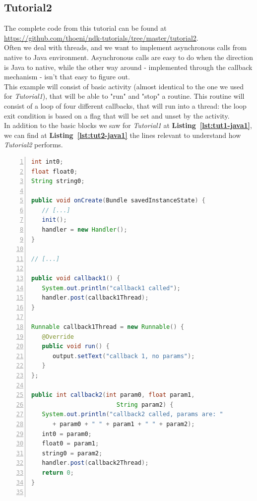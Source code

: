 \documentclass[a4paper,10pt]{article}
\newcommand{\refl}[1]{\textbf{Listing~\ref{#1}}}
\begin{document}
\begin{multicols}{2}

\section{Tutorial2}
\label{sec:tutorial2}
The complete code from this tutorial can be found at
\url{https://github.com/thoeni/ndk-tutorials/tree/master/tutorial2}.\\
Often we deal with threads, and we want to implement asynchronous calls from
native to Java environment. Asynchronous calls are easy to do when the direction
is Java to native, while the other way around - implemented through the callback
mechanism - isn't that easy to figure out.\\
This example will consist of basic activity (almost identical to the one we used
for \textit{Tutorial1}), that will be able to "run" and "stop" a routine. This
routine will consist of a loop of four different callbacks, that will run into a
thread: the loop exit condition is based on a flag that will be set and unset by
the activity.\\
In addition to the basic blocks we saw for \textit{Tutorial1} at
\refl{lst:tut1-java1}, we can find at \refl{lst:tut2-java1} the lines relevant
to understand how \textit{Tutorial2} performs.
\begin{lstlisting}[language=Java,
		   columns=fullflexible,
		   showstringspaces=false,
		   xleftmargin=15pt,
		   frame = l,
		   numbers=left,
		   commentstyle=\color{gray}\upshape,
		   caption=Part of Tutorial2Activity.java source code,
		   label=lst:tut2-java1]
int int0;
float float0;
String string0;

public void onCreate(Bundle savedInstanceState) {
   // [...]
   init();
   handler = new Handler();
}

// [...]

public void callback1() {
   System.out.println("callback1 called");
   handler.post(callback1Thread);
}

Runnable callback1Thread = new Runnable() {
   @Override
   public void run() {
      output.setText("callback 1, no params");
   }
};

public int callback2(int param0, float param1,
                        String param2) {
   System.out.println("callback2 called, params are: "
      + param0 + " " + param1 + " " + param2);
   int0 = param0;
   float0 = param1;
   string0 = param2;
   handler.post(callback2Thread);
   return 0;
}


\end{lstlisting}
\end{multicols}
\end{document}
